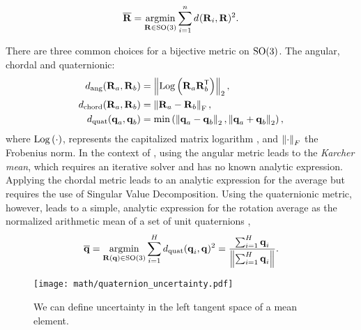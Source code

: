 \begin{equation}
\label{eq:rot_mean}
\boldsymbol{\mathbf{\overline{R}}} = \operatorname*{argmin}_{\boldsymbol{\mathbf{R}} \in \mathrm{SO}(3)} \sum_{i=1}^n d_\mathrm{}(\boldsymbol{\mathbf{R}}_i, \boldsymbol{\mathbf{R}})^2.
\end{equation}





There are three common choices for a bijective metric \citep{Hartley2013-rc,Carlone2015-ud} on $\mathrm{SO}(3)$. The angular, chordal and quaternionic:
\begin{align}
d_\mathrm{ang}(\boldsymbol{\mathbf{R}}_a, \boldsymbol{\mathbf{R}}_b) &= \left\Vert\mathrm{Log}\left({\boldsymbol{\mathbf{R}}_a \boldsymbol{\mathbf{R}}_b^{\mkern-1.0mu\mathsf{T}}}\right)\right\Vert_2, \\
 d_\mathrm{chord}(\boldsymbol{\mathbf{R}}_a, \boldsymbol{\mathbf{R}}_b) &= \left\Vert\boldsymbol{\mathbf{R}}_a - \boldsymbol{\mathbf{R}}_b\right\Vert_\mathrm{F}, \\
 d_\mathrm{quat}(\boldsymbol{\mathbf{q}}_a, \boldsymbol{\mathbf{q}}_b) &= \min\left( \left\Vert\boldsymbol{\mathbf{q}}_a - \boldsymbol{\mathbf{q}}_b\right\Vert_2, \left\Vert\boldsymbol{\mathbf{q}}_a + \boldsymbol{\mathbf{q}}_b\right\Vert_2 \right),
\end{align}
where $\mathrm{Log}\left({\cdot}\right)$, represents the capitalized matrix logarithm \citep{Sola2018-kg}, and $\left\Vert\cdot\right\Vert_F$ the Frobenius norm. In the context of , using the angular metric leads to the \textit{Karcher mean}, which requires an iterative solver and has no known analytic expression. Applying the chordal metric leads to an analytic expression for the average but requires the use of Singular Value Decomposition. Using the quaternionic metric, however, leads to a simple, analytic expression for the rotation average as the normalized arithmetic mean of a set of unit quaternions \citep{Hartley2013-rc},
\begin{equation}
\label{eq:quat_mean}
\overline{\boldsymbol{\mathbf{q}}} = \operatorname*{argmin}_{\boldsymbol{\mathbf{R}}(\boldsymbol{\mathbf{q}}) \in \mathrm{SO}(3)} \sum_{i=1}^H d_\mathrm{quat}(\boldsymbol{\mathbf{q}}_i, \boldsymbol{\mathbf{q}})^2 = \frac{\sum_{i=1}^H \boldsymbol{\mathbf{q}}_i}{\left\Vert\sum_{i=1}^H \boldsymbol{\mathbf{q}}_i\right\Vert}.
\end{equation}

\begin{wrapfigure}{r}{0.35\textwidth}
  \vspace{-20pt}
  \begin{center}
	\texttt{[image: math/quaternion\_uncertainty.pdf]}
  \end{center}
    \vspace{-20pt}
	\label{fig:math_quat_uncertainty}
	\caption{We can define uncertainty in the left tangent space of a mean element.}
\end{wrapfigure} 

